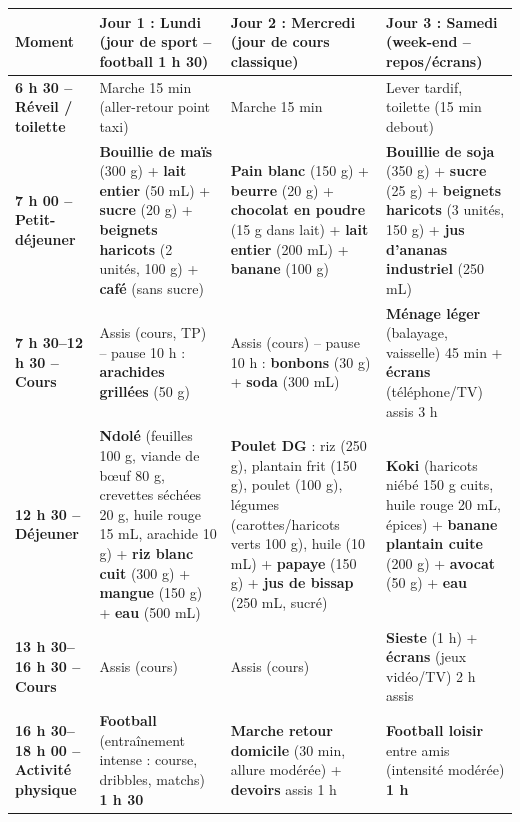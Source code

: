 \documentclass[11pt]{article}
\begin{document}
\begin{center}
\begin{tabularx}{\linewidth}{|l|X|X|X|}\hline
\rowcolor{popblueL}
\textbf{Moment} & \textbf{Jour 1 : Lundi (jour de sport -- football 1 h 30)} & \textbf{Jour 2 : Mercredi (jour de cours classique)} & \textbf{Jour 3 : Samedi (week-end -- repos/écrans)} \\ \hline
\textbf{6 h 30 -- Réveil / toilette} & Marche 15 min (aller-retour point taxi) & Marche 15 min & Lever tardif, toilette (15 min debout) \\ \hline
\textbf{7 h 00 -- Petit-déjeuner} & \textbf{Bouillie de maïs} (300 g) + \textbf{lait entier} (50 mL) + \textbf{sucre} (20 g) + \textbf{beignets haricots} (2 unités, 100 g) + \textbf{café} (sans sucre) & \textbf{Pain blanc} (150 g) + \textbf{beurre} (20 g) + \textbf{chocolat en poudre} (15 g dans lait) + \textbf{lait entier} (200 mL) + \textbf{banane} (100 g) & \textbf{Bouillie de soja} (350 g) + \textbf{sucre} (25 g) + \textbf{beignets haricots} (3 unités, 150 g) + \textbf{jus d'ananas industriel} (250 mL) \\ \hline
\textbf{7 h 30--12 h 30 -- Cours} & Assis (cours, TP) -- pause 10 h : \textbf{arachides grillées} (50 g) & Assis (cours) -- pause 10 h : \textbf{bonbons} (30 g) + \textbf{soda} (300 mL) & \textbf{Ménage léger} (balayage, vaisselle) 45 min + \textbf{écrans} (téléphone/TV) assis 3 h \\ \hline
\textbf{12 h 30 -- Déjeuner} & \textbf{Ndolé} (feuilles 100 g, viande de bœuf 80 g, crevettes séchées 20 g, huile rouge 15 mL, arachide 10 g) + \textbf{riz blanc cuit} (300 g) + \textbf{mangue} (150 g) + \textbf{eau} (500 mL) & \textbf{Poulet DG} : riz (250 g), plantain frit (150 g), poulet (100 g), légumes (carottes/haricots verts 100 g), huile (10 mL) + \textbf{papaye} (150 g) + \textbf{jus de bissap} (250 mL, sucré) & \textbf{Koki} (haricots niébé 150 g cuits, huile rouge 20 mL, épices) + \textbf{banane plantain cuite} (200 g) + \textbf{avocat} (50 g) + \textbf{eau} \\ \hline
\textbf{13 h 30--16 h 30 -- Cours} & Assis (cours) & Assis (cours) & \textbf{Sieste} (1 h) + \textbf{écrans} (jeux vidéo/TV) 2 h assis \\ \hline
\textbf{16 h 30--18 h 00 -- Activité physique} & \textbf{Football} (entraînement intense : course, dribbles, matchs) \textbf{1 h 30} & \textbf{Marche retour domicile} (30 min, allure modérée) + \textbf{devoirs} assis 1 h & \textbf{Football loisir} entre amis (intensité modérée) \textbf{1 h} \\ \hline

\end{tabularx}
\end{center}
\end{document}
